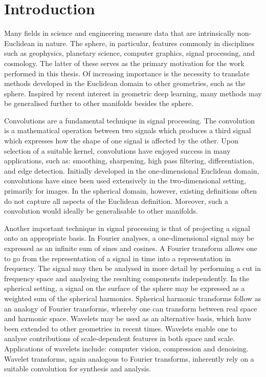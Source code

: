 \chapter{Introduction}\label{sec:chapter1}

Many fields in science and engineering measure data that are intrinsically non-Euclidean in nature.
The sphere, in particular, features commonly in disciplines such as geophysics, planetary science, computer graphics, signal processing, and cosmology.
The latter of these serves as the primary motivation for the work performed in this thesis.
Of increasing importance is the necessity to translate methods developed in the Euclidean domain to other geometries, such as the sphere.
Inspired by recent interest in geometric deep learning, many methods may be generalised further to other manifolds besides the sphere.

Convolutions are a fundamental technique in signal processing.
The convolution is a mathematical operation between two signals which produces a third signal which expresses how the shape of one signal is affected by the other.
Upon selection of a suitable kernel, convolutions have enjoyed success in many applications, such as: smoothing, sharpening, high pass filtering, differentiation, and edge detection.
Initially developed in the one-dimensional Euclidean domain, convolutions have since been used extensively in the two-dimensional setting, primarily for images.
In the spherical domain, however, existing definitions often do not capture all aspects of the Euclidean definition.
Moreover, such a convolution would ideally be generalisable to other manifolds.

Another important technique in signal processing is that of projecting a signal onto an appropriate basis.
In Fourier analyses, a one-dimensional signal may be expressed as an infinite sum of sines and cosines.
A Fourier transform allows one to go from the representation of a signal in time into a representation in frequency.
The signal may then be analysed in more detail by performing a cut in frequency space and analysing the resulting components independently.
In the spherical setting, a signal on the surface of the sphere may be expressed as a weighted sum of the spherical harmonics.
Spherical harmonic transforms follow as an analogy of Fourier transforms, whereby one can transform between real space and harmonic space.
Wavelets may be used as an alternative basis, which have been extended to other geometries in recent times.
Wavelets enable one to analyse contributions of scale-dependent features in both space and scale.
Applications of wavelets include: computer vision, compression and denoising.
Wavelet transforms, again analogous to Fourier transforms, inherently rely on a suitable convolution for synthesis and analysis.

